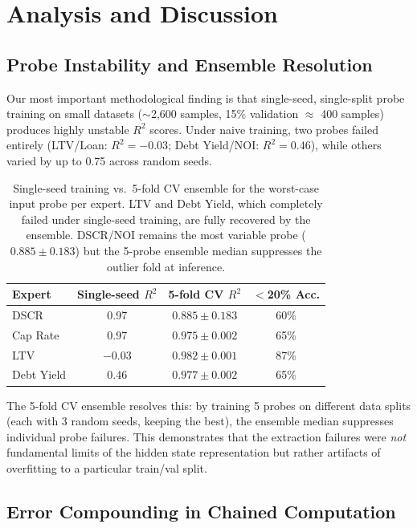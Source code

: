 \section{Analysis and Discussion}
\label{sec:analysis}

\subsection{Probe Instability and Ensemble Resolution}
\label{sec:analysis:instability}

Our most important methodological finding is that single-seed,
single-split probe training on small datasets (${\sim}$2{,}600
samples, 15\% validation $\approx$ 400 samples) produces highly
unstable $R^2$ scores. Under naive training, two probes failed entirely
(LTV/Loan: $R^2 = -0.03$; Debt Yield/NOI: $R^2 = 0.46$), while
others varied by up to 0.75 across random seeds.

\begin{table}[h]
\centering
\begin{tabular}{@{}lccc@{}}
\toprule
\textbf{Expert} & \textbf{Single-seed $R^2$} & \textbf{5-fold CV $R^2$} & \textbf{$<$20\% Acc.} \\
\midrule
DSCR       & 0.97  & $0.885 \pm 0.183$ & 60\% \\
Cap Rate   & 0.97  & $0.975 \pm 0.002$ & 65\% \\
LTV        & $-$0.03 & $0.982 \pm 0.001$ & 87\% \\
Debt Yield & 0.46  & $0.977 \pm 0.002$ & 65\% \\
\bottomrule
\end{tabular}
\caption{Single-seed training vs.\ 5-fold CV ensemble for the
worst-case input probe per expert. LTV and Debt Yield, which
completely failed under single-seed training, are fully recovered
by the ensemble. DSCR/NOI remains the most variable probe
($0.885 \pm 0.183$) but the 5-probe ensemble median suppresses
the outlier fold at inference.}
\label{tab:bottleneck}
\end{table}

The 5-fold CV ensemble resolves this: by training 5 probes on
different data splits (each with 3 random seeds, keeping the best),
the ensemble median suppresses individual probe failures. This
demonstrates that the extraction failures were \emph{not}
fundamental limits of the hidden state representation but rather
artifacts of overfitting to a particular train/val split.

\subsection{Error Compounding in Chained Computation}
\label{sec:analysis:compounding}

